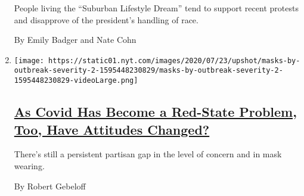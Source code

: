 \begin{enumerate}
  People living the ``Suburban Lifestyle Dream'' tend to support recent
  protests and disapprove of the president's handling of race.

  By Emily Badger and Nate Cohn
\item
  \texttt{[image: https://static01.nyt.com/images/2020/07/23/upshot/masks-by-outbreak-severity-2-1595448230829/masks-by-outbreak-severity-2-1595448230829-videoLarge.png]}

  \hypertarget{as-covid-has-become-a-red-state-problem-too-have-attitudes-changed}{%
  \subsection{\texorpdfstring{\href{/2020/07/30/upshot/coronavirus-republican-voting.html}{As
  Covid Has Become a Red-State Problem, Too, Have Attitudes
  Changed?}}{As Covid Has Become a Red-State Problem, Too, Have Attitudes Changed?}}\label{as-covid-has-become-a-red-state-problem-too-have-attitudes-changed}}

  There's still a persistent partisan gap in the level of concern and in
  mask wearing.

  By Robert Gebeloff
\end{enumerate}

